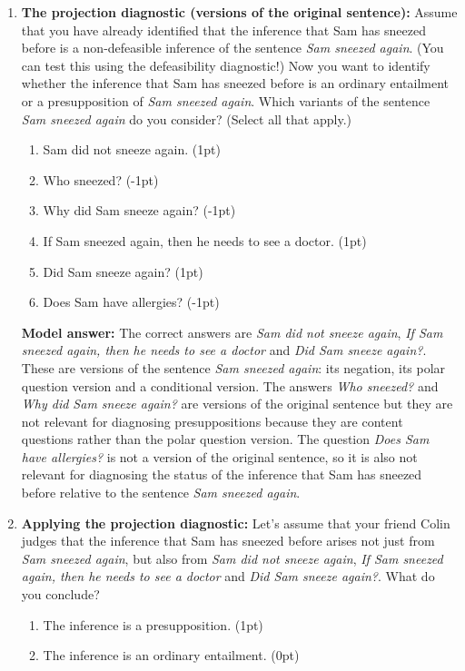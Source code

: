 \documentclass[a4,11pt]{article}
\begin{document}
\begin{enumerate}[leftmargin = 12pt]
 \item {\bf The projection diagnostic (versions of the original sentence):} Assume that you have already identified that the inference that Sam has sneezed before is a non-defeasible inference of the sentence {\em Sam sneezed again}. (You can test this using the defeasibility diagnostic!) Now you want to identify whether the inference that Sam has sneezed before is an ordinary entailment or a presupposition of {\em Sam sneezed again}. Which variants of the sentence {\em Sam sneezed again} do you consider? (Select all that apply.)
 
    \begin{enumerate}[noitemsep]
        \item Sam did not sneeze again. (1pt)
         \item Who sneezed? (-1pt)
           \item Why did Sam sneeze again? (-1pt)
           \item If Sam sneezed again, then he needs to see a doctor. (1pt)
           \item Did Sam sneeze again? (1pt)
           \item Does Sam have allergies? (-1pt)
    \end{enumerate}
  
{\bf Model answer:}  The correct answers are {\em Sam did not sneeze again}, {\em If Sam sneezed again, then he needs to see a doctor} and {\em Did Sam sneeze again?}. These are versions of the sentence {\em Sam sneezed again}: its negation, its polar question version and a conditional version. The answers {\em Who sneezed?} and {\em  Why did Sam sneeze again?} are versions of the original sentence but they are not relevant for diagnosing presuppositions because they are content questions rather than the polar question version. The question {\em Does Sam have allergies?} is not a version of the original sentence, so it is also not relevant for diagnosing the status of the inference that Sam has sneezed before relative to the sentence {\em Sam sneezed again}.
  
  \item {\bf Applying the projection diagnostic:} Let's assume that your friend Colin judges that the inference that Sam has sneezed before arises not just from {\em Sam sneezed again}, but also from {\em Sam did not sneeze again}, {\em If Sam sneezed again, then he needs to see a doctor} and {\em Did Sam sneeze again?}. What do you conclude?
   
    \begin{enumerate}[noitemsep]
        \item The inference is a presupposition. (1pt)
 	\item The inference is an ordinary entailment. (0pt)
    \end{enumerate}
  

\end{enumerate}
\end{document}
